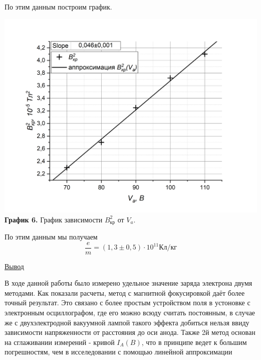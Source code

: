 \documentclass{article}
\begin{document}
По этим данным построим график.
\begin{center}
\includegraphics[width = \textwidth]{images/image8.png}\\
\textbf{График 6.} График зависимости $B_{\text{кр}}^2$ от $V_a$.
\end{center}
По этим данным мы получаем 
\[\dfrac{e}{m} = (1,3 \pm 0,5) \cdot 10^{11} \text{Кл}/\text{кг}\]

\begin{center}
    \raggedleft
        \underline{\underline{\LARGE {Вывод}}}
\end{center}

В ходе данной работы было измерено удельное значение заряда электрона двумя методами. Как показали расчеты, метод с магнитной фокусировкой даёт более точный результат. Это связано с более простым устройством поля в устоновке с электронным осциллографом, где его можно всюду считать постоянным, в случае же с двухэлектродной вакуумной лампой такого эффекта добиться нельзя ввиду зависимости напряженности от расстояния до оси анода. Также 2й метод основан на сглаживании измерений - кривой \(I_{A}(B)\), что в принципе ведет к большим погрешностям, чем в исселедовании с помощью линейной аппроксимации
\end{document}
